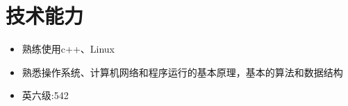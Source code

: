 \documentclass[11pt,a4paper,sans]{moderncv} %
\begin{document}
\section{技术能力}
\begin{itemize}
\item 熟练使用c++、Linux
\item 熟悉操作系统、计算机网络和程序运行的基本原理，基本的算法和数据结构
\item 英六级:542
\end{itemize}


\clearpage





\end{document}
